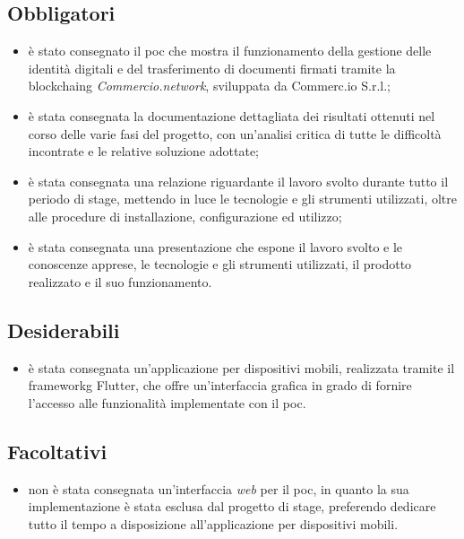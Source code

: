 \subsection{Obbligatori}
\begin{itemize}
	\item è stato consegnato il \gls{poc} che mostra il funzionamento della gestione delle identità digitali e del trasferimento di documenti firmati tramite la \gls{blockchaing} \textit{Commercio.network}, sviluppata da Commerc.io S.r.l.;
	\item è stata consegnata la documentazione dettagliata dei risultati ottenuti nel corso delle varie fasi del progetto, con un'analisi critica di tutte le difficoltà incontrate e le relative soluzione adottate;
	\item è stata consegnata una relazione riguardante il lavoro svolto durante tutto il periodo di stage, mettendo in luce le tecnologie e gli strumenti utilizzati, oltre alle procedure di installazione, configurazione ed utilizzo;
	\item è stata consegnata una presentazione che espone il lavoro svolto e le conoscenze apprese, le tecnologie e gli strumenti utilizzati, il prodotto realizzato e il suo funzionamento.
\end{itemize}

\subsection{Desiderabili}

\begin{itemize}
	\item è stata consegnata un'applicazione per dispositivi mobili, realizzata tramite il \gls{frameworkg} Flutter, che offre un'interfaccia grafica in grado di fornire l'accesso alle funzionalità implementate con il \gls{poc}.
\end{itemize}

\subsection{Facoltativi}

\begin{itemize}
	\item non è stata consegnata un'interfaccia \textit{web} per il \gls{poc}, in quanto la sua implementazione è stata esclusa dal progetto di stage, preferendo dedicare tutto il tempo a disposizione all'applicazione per dispositivi mobili.
\end{itemize} 

